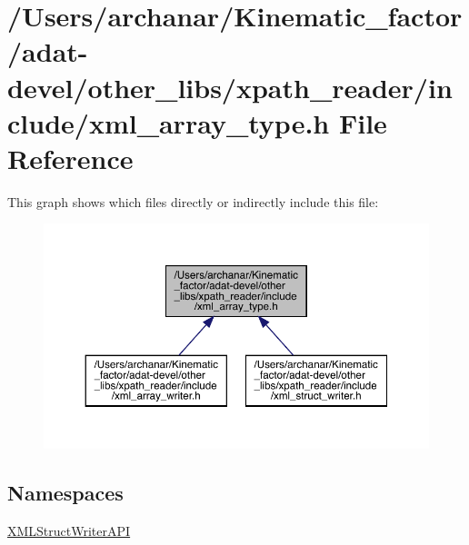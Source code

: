 \hypertarget{adat-devel_2other__libs_2xpath__reader_2include_2xml__array__type_8h}{}\section{/\+Users/archanar/\+Kinematic\+\_\+factor/adat-\/devel/other\+\_\+libs/xpath\+\_\+reader/include/xml\+\_\+array\+\_\+type.h File Reference}
\label{adat-devel_2other__libs_2xpath__reader_2include_2xml__array__type_8h}
This graph shows which files directly or indirectly include this file\+:
\nopagebreak
\begin{figure}[H]
\begin{center}
\leavevmode
\includegraphics[width=350pt]{d6/dd9/adat-devel_2other__libs_2xpath__reader_2include_2xml__array__type_8h__dep__incl}
\end{center}
\end{figure}
\subsection*{Namespaces}
\begin{DoxyCompactItemize}
\item 
 \mbox{\hyperlink{namespaceXMLStructWriterAPI}{X\+M\+L\+Struct\+Writer\+A\+PI}}
\end{DoxyCompactItemize}
